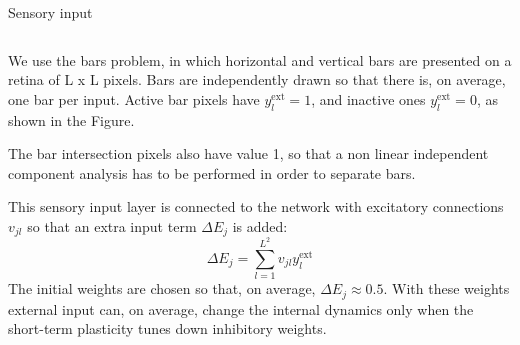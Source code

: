 \documentclass[final,hyperref={pdfpagelabels=false}]{beamer}
\begin{document}
\begin{frame}
\begin{columns}
\begin{column}{.64\textwidth}
\begin{minipage}[T]{.95\textwidth}
{\begin{block}{Sensory input}
\begin{columns}
\begin{column}[T]{.9\textwidth}
								We use the bars problem, in which horizontal and vertical bars are presented on a retina of L x L pixels. Bars are independently drawn so that there is, on average, one bar per input. Active bar pixels have $y_l^{\text{ext}}=1$, and inactive ones $y_l^{\text{ext}}=0$, as shown in the Figure.
														
								The bar intersection pixels also have value 1, so that a non linear independent component analysis has to be performed in order to separate bars.
								
								This sensory input layer is connected to the network with excitatory connections $v_{jl}$ so that an extra input term $\Delta E_j$ is added:
								\begin{equation*}
									\Delta E_j = \sum_{l=1}^{L^2} v_{jl} y_l^{\text{ext}}
								\end{equation*}
								The initial weights are chosen so that, on average, $\Delta E_j \approx 0.5$. With these weights external input can, on average, change the internal dynamics only when the short-term plasticity tunes down inhibitory weights.
							
							\end{column}
						\end{columns}

							

					\end{block}
						
}
\end{minipage}
\end{column}
\end{columns}
\end{frame}
\end{document}
